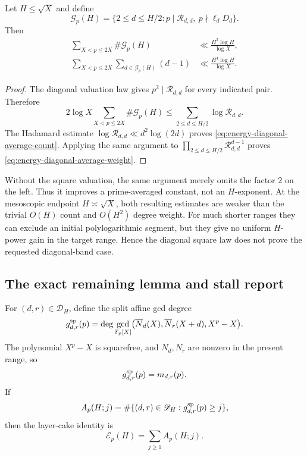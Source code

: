 \begin{proposition}
\label{prop:energy-diagonal-valuation-average}
Let $H\leq\sqrt X$ and define
\[
 \mathscr G_p(H)=\{2\leq d\leq H/2:
 p\mid\mathcal R_{d,d},\ p\nmid\ell_dD_d\}.
\]
Then
\begin{align}
 \sum_{X<p\leq2X}\#\mathscr G_p(H)
 &\ll\frac{H^3\log H}{\log X},
 \label{eq:energy-diagonal-average-count}\\
 \sum_{X<p\leq2X}\sum_{d\in\mathscr G_p(H)}(d-1)
 &\ll\frac{H^4\log H}{\log X}.
 \label{eq:energy-diagonal-average-weight}
\end{align}
\end{proposition}

\begin{proof}
The diagonal valuation law gives $p^2\mid\mathcal R_{d,d}$ for every
indicated pair.  Therefore
\[
 2\log X\sum_{X<p\leq2X}\#\mathscr G_p(H)
 \leq\sum_{2\leq d\leq H/2}\log\mathcal R_{d,d}.
\]
The Hadamard estimate
$\log\mathcal R_{d,d}\ll d^2\log(2d)$ proves
\eqref{eq:energy-diagonal-average-count}.  Applying the same argument to
$\prod_{2\leq d\leq H/2}\mathcal R_{d,d}^{d-1}$ proves
\eqref{eq:energy-diagonal-average-weight}.
\end{proof}

Without the square valuation, the same argument merely omits the factor
$2$ on the left.  Thus it improves a prime-averaged constant, not an
$H$-exponent.  At the mesoscopic endpoint $H\asymp\sqrt X$, both
resulting estimates are weaker than the trivial $O(H)$ count and
$O(H^2)$ degree weight.  For much shorter ranges they can exclude an
initial polylogarithmic segment, but they give no uniform $H$-power gain
in the target range.  Hence the diagonal square law does not prove the
requested diagonal-band case.

\subsection{The exact remaining lemma and stall report}

For $(d,r)\in\mathscr D_H$, define the split affine gcd degree
\[
 g_{d,r}^{\rm sp}(p)=
 \deg\gcd_{\mathbb F_p[X]}
 \bigl(\overline N_d(X),\overline N_r(X+d),X^p-X\bigr).
\]
The polynomial $X^p-X$ is squarefree, and $N_d,N_r$ are nonzero in the
present range, so
\begin{equation}\label{eq:energy-split-gcd-equals-m}
 g_{d,r}^{\rm sp}(p)=m_{d,r}(p).
\end{equation}
If
\[
 A_p(H;j)=\#\{(d,r)\in\mathscr D_H:g_{d,r}^{\rm sp}(p)\geq j\},
\]
then the layer-cake identity is
\begin{equation}\label{eq:energy-layer-cake}
 \boxed{\mathcal E_p(H)=\sum_{j\geq1}A_p(H;j).}
\end{equation}

